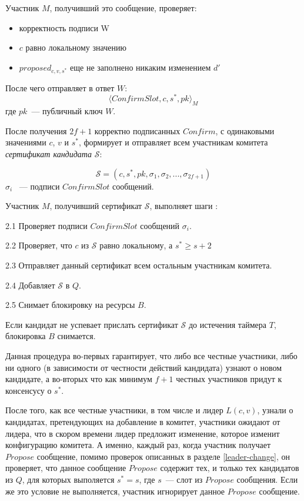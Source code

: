 \noindent Участник $M$, получивший это сообщение, проверяет:
\begin{itemize}
\item корректность подписи W
\item $c$ равно локальному значению
\item $proposed_{c, v, s^{*}}$ еще не заполнено никаким изменением $d'$
\end{itemize} 
После чего отправляет в ответ $W$:
 \[ \langle ConfirmSlot, c, s^{*}, pk \rangle_M \]
где $pk$~--- публичный ключ $W$.
\vspace{10pt}

После получения $2f+1$ корректно подписанных $Confirm$, с одинаковыми значениями $c$, $v$ и $s^{*}$,
формирует и отправляет всем участникам комитета \textit{сертификат кандидата} $\mathcal{S}$:

$$\mathcal{S}=(c, s^{*}, pk, \sigma_1, \sigma_2,..., \sigma_{2f+1})$$
$\sigma_i$ ~--- подписи $ConfirmSlot$ сообщений.
\vspace{10pt}

Участник $M$, получивший сертификат $\mathcal{S}$, выполняет шаги : 

2.1 Проверяет подписи $ConfirmSlot$ сообщений $\sigma_i$.

2.2 Проверяет, что $c$ из $\mathcal{S}$ равно локальному, а $s^{*} \ge s + 2$

2.3 Отправляет данный сертификат всем остальным участникам комитета.

2.4 Добавляет $\mathcal{S}$ в $Q$.

2.5 Снимает блокировку на ресурсы $B$.

Если кандидат не успевает прислать сертификат $\mathcal{S}$ до истечения таймера $T$, блокировка $B$ снимается.

Данная процедура во-первых гарантирует, что либо все честные участники, либо ни одного (в зависимости от честности действий кандидата) узнают о новом кандидате, а во-вторых что как минимум $f+1$ честных участников придут к консенсусу о $s^{*}$.

После того, как все честные участники, в том числе и лидер $L(c, v)$, узнали о кандидатах, претендующих на добавление в комитет, участники ожидают от лидера, что в скором времени лидер предложит изменение, которое изменит конфигурацию комитета. А именно, каждый раз, когда участник получает $Propose$ сообщение, помимо проверок описанных в  разделе \ref{leader-change}, он проверяет, что данное сообщение $Propose$ содержит тех, и только тех кандидатов из $Q$, для которых выполяется $s^{*} = s$, где $s$~--- слот из $Propose$ сообщения. Если же это условие не выполняется, участник игнорирует данное $Propose$ сообщение.

